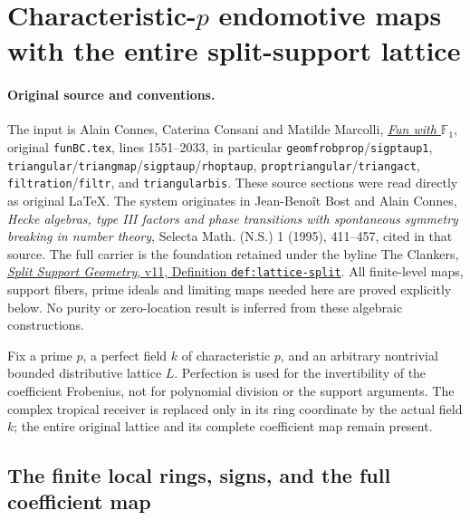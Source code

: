 \section{Characteristic-$p$ endomotive maps with the entire split-support lattice}
\label{sec:cc-char-p-full-support}

\paragraph{Original source and conventions.}
The input is Alain Connes, Caterina Consani and Matilde Marcolli,
\href{https://arxiv.org/abs/0806.2401v1}{\emph{Fun with $\mathbb F_1$}},
original \nolinkurl{funBC.tex}, lines 1551--2033, in particular
\texttt{geomfrobprop}/\texttt{sigptaup1},
\texttt{triangular}/\texttt{triangmap}/\texttt{sigptaup}/\texttt{rhoptaup},
\texttt{proptriangular}/\texttt{triangact},
\texttt{filtration}/\texttt{filtr}, and \texttt{triangularbis}.
These source sections were read directly as original LaTeX.
The system originates in Jean-Beno\^it Bost and Alain Connes,
\emph{Hecke algebras, type III factors and phase transitions with
spontaneous symmetry breaking in number theory}, Selecta Math.
(N.S.) 1 (1995), 411--457, cited in that source.
The full carrier is the foundation retained under the byline
The Clankers,
\href{https://github.com/KokunoYumeto/zeta-function-research-reader/blob/a2851f9eb352e7e4376bc629de86fa4ed9c1c434/workbenches/splitzero-tandem/foundations/split-support-geometry-v11/split_support_geometry_arithmetic_curve_v11.tex}{\emph{Split Support Geometry}, v11, Definition \texttt{def:lattice-split}}.
All finite-level maps, support fibers, prime ideals and limiting
maps needed here are proved explicitly below. No purity or
zero-location result is inferred from these algebraic constructions.

Fix a prime $p$, a perfect field $k$ of characteristic $p$, and
an arbitrary nontrivial bounded distributive lattice $L$.
Perfection is used for the invertibility of the coefficient
Frobenius, not for polynomial division or the support arguments.
The complex tropical receiver is replaced only in its ring
coordinate by the actual field $k$; the entire original lattice
and its complete coefficient map remain present.

\subsection{The finite local rings, signs, and the full coefficient map}

